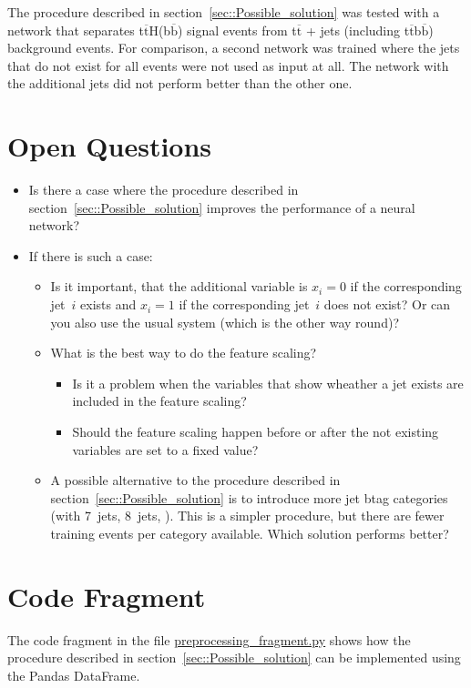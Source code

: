 \documentclass[12pt,a4paper]{article}
\begin{document}
The procedure described in section~\ref{sec::Possible_solution} was tested with a network that separates t$\overline{\text{t}}$H(b$\overline{\text{b}}$) signal events from t$\overline{\text{t}}$ + jets (including t$\overline{\text{t}}$b$\overline{\text{b}}$) background events. For comparison, a second network was trained where the jets that do not exist for all events were not used as input at all. The network with the additional jets did not perform better than the other one.


\section{Open Questions}

\begin{itemize}
\item Is there a case where the procedure described in section~\ref{sec::Possible_solution} improves the performance of a neural network?
\item If there is such a case:
\begin{itemize}
\item Is it important, that the additional variable is $x_i = 0$ if the corresponding jet~$i$ exists and $x_i = 1$ if the corresponding jet~$i$ does not exist? Or can you also use the usual system (which is the other way round)?
\item What is the best way to do the feature scaling?
\begin{itemize}
\item Is it a problem when the variables that show wheather a jet exists are included in the feature scaling?
\item Should the feature scaling happen before or after the not existing variables are set to a fixed value?
\end{itemize}
\item A possible alternative to the procedure described in section~\ref{sec::Possible_solution} is to introduce more jet btag categories (with 7~jets, 8~jets, \textellipsis\unkern). This is a simpler procedure, but there are fewer training events per category available. Which solution performs better?
\end{itemize}
\end{itemize}


\section{Code Fragment}

The code fragment in the file \url{preprocessing_fragment.py} shows how the procedure described in section~\ref{sec::Possible_solution} can be implemented using the Pandas DataFrame.
\end{document}
